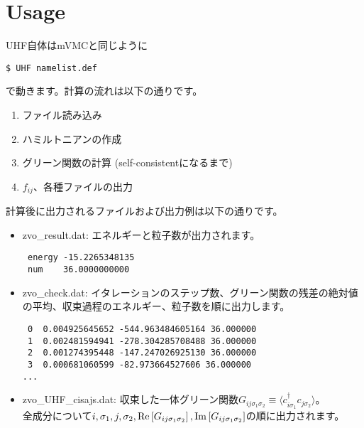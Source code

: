 \section{Usage}
UHF自体はmVMCと同じように
\begin{verbatim}
$ UHF namelist.def
\end{verbatim}
で動きます。計算の流れは以下の通りです。
\begin{enumerate}
\item{ファイル読み込み}
\item{ハミルトニアンの作成}
\item{グリーン関数の計算 (self-consistentになるまで)}
\item{$f_{ij}$、各種ファイルの出力}
\end{enumerate}
計算後に出力されるファイルおよび出力例は以下の通りです。
\begin{itemize}
\item{zvo\_result.dat:}  エネルギーと粒子数が出力されます。\\
\begin{minipage}{13cm}
\begin{screen}
\begin{verbatim}
 energy -15.2265348135
 num    36.0000000000
\end{verbatim}
\end{screen}
\end{minipage}
\item{zvo\_check.dat:} イタレーションのステップ数、グリーン関数の残差の絶対値の平均、収束過程のエネルギー、粒子数を順に出力します。

\begin{minipage}{13cm}
\begin{screen}
\begin{verbatim}
 0  0.004925645652 -544.963484605164 36.000000
 1  0.002481594941 -278.304285708488 36.000000
 2  0.001274395448 -147.247026925130 36.000000
 3  0.000681060599 -82.973664527606 36.000000
...
\end{verbatim}
\end{screen}
\end{minipage}

\item{zvo\_UHF\_cisajs.dat:} 収束した一体グリーン関数$G_{ij\sigma_1\sigma_2}\equiv\langle c_{i\sigma_1}^{\dag}c_{j\sigma_2}\rangle$。\\
全成分について$i, \sigma_1, j, \sigma_2, {\rm Re}\left[G_{ij\sigma_1\sigma_2}\right], {\rm Im}\left[G_{ij\sigma_1\sigma_2}\right]$の順に出力されます。


\end{itemize}
